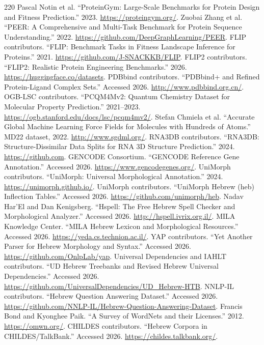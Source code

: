 \documentclass[11pt]{article}
\newcommand{\1}{\mathbf{1}}
\begin{document}
\begin{thebibliography}{220}
 Pascal Notin et al. ``ProteinGym: Large-Scale Benchmarks for Protein Design and Fitness Prediction.'' 2023. \url{https://proteingym.org/}.
 Zuobai Zhang et al. ``PEER: A Comprehensive and Multi-Task Benchmark for Protein Sequence Understanding.'' 2022. \url{https://github.com/DeepGraphLearning/PEER}.
 FLIP contributors. ``FLIP: Benchmark Tasks in Fitness Landscape Inference for Proteins.'' 2021. \url{https://github.com/J-SNACKKB/FLIP}.
 FLIP2 contributors. ``FLIP2: Realistic Protein Engineering Benchmarks.'' 2026. \url{https://huggingface.co/datasets}.
 PDBbind contributors. ``PDBbind+ and Refined Protein-Ligand Complex Sets.'' Accessed 2026. \url{http://www.pdbbind.org.cn/}.
 OGB-LSC contributors. ``PCQM4Mv2: Quantum Chemistry Dataset for Molecular Property Prediction.'' 2021--2023. \url{https://ogb.stanford.edu/docs/lsc/pcqm4mv2/}.
 Stefan Chmiela et al. ``Accurate Global Machine Learning Force Fields for Molecules with Hundreds of Atoms.'' MD22 dataset, 2022. \url{http://www.sgdml.org/}.
 RNA3DB contributors. ``RNA3DB: Structure-Dissimilar Data Splits for RNA 3D Structure Prediction.'' 2024. \url{https://github.com}.
 GENCODE Consortium. ``GENCODE Reference Gene Annotation.'' Accessed 2026. \url{https://www.gencodegenes.org/}.
 UniMorph contributors. ``UniMorph: Universal Morphological Annotation.'' 2024. \url{https://unimorph.github.io/}.
 UniMorph contributors. ``UniMorph Hebrew (heb) Inflection Tables.'' Accessed 2026. \url{https://github.com/unimorph/heb}.
 Nadav Har'El and Dan Kenigsberg. ``Hspell: The Free Hebrew Spell Checker and Morphological Analyzer.'' Accessed 2026. \url{http://hspell.ivrix.org.il/}.
 MILA Knowledge Center. ``MILA Hebrew Lexicon and Morphological Resources.'' Accessed 2026. \url{https://yeda.cs.technion.ac.il/}.
 YAP contributors. ``Yet Another Parser for Hebrew Morphology and Syntax.'' Accessed 2026. \url{https://github.com/OnlpLab/yap}.
 Universal Dependencies and IAHLT contributors. ``UD Hebrew Treebanks and Revised Hebrew Universal Dependencies.'' Accessed 2026. \url{https://github.com/UniversalDependencies/UD_Hebrew-HTB}.
 NNLP-IL contributors. ``Hebrew Question Answering Dataset.'' Accessed 2026. \url{https://github.com/NNLP-IL/Hebrew-Question-Answering-Dataset}.
 Francis Bond and Kyonghee Paik. ``A Survey of WordNets and their Licenses.'' 2012. \url{https://omwn.org/}.
 CHILDES contributors. ``Hebrew Corpora in CHILDES/TalkBank.'' Accessed 2026. \url{https://childes.talkbank.org/}.

\end{thebibliography}
\end{document}
